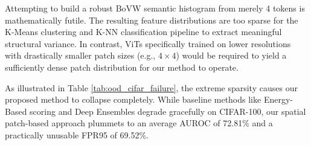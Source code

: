 \documentclass[oneside]{ctuthesis}
\begin{document}
Attempting to build a robust BoVW semantic histogram from merely 4 tokens is mathematically futile. The resulting feature distributions are too sparse for the K-Means clustering and K-NN classification pipeline to extract meaningful structural variance. In contrast, ViTs specifically trained on lower resolutions with drastically smaller patch sizes (e.g., $4 \times 4$) would be required to yield a sufficiently dense patch distribution for our method to operate.

As illustrated in Table \ref{tab:ood_cifar_failure}, the extreme sparsity causes our proposed method to collapse completely. While baseline methods like Energy-Based scoring and Deep Ensembles degrade gracefully on CIFAR-100, our spatial patch-based approach plummets to an average AUROC of 72.81\% and a practically unusable FPR95 of 69.52\%.
\end{document}

